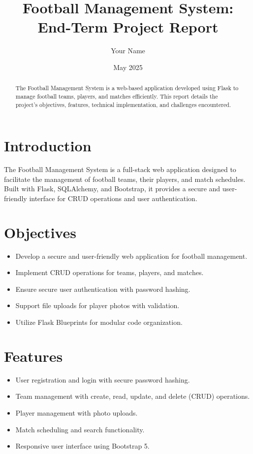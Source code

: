 \documentclass[a4paper,12pt]{article}
\begin{document}
\title{Football Management System: End-Term Project Report}
\author{Your Name}
\date{May 2025}
\maketitle

\begin{abstract}
The Football Management System is a web-based application developed using Flask to manage football teams, players, and matches efficiently. This report details the project's objectives, features, technical implementation, and challenges encountered.
\end{abstract}

\section{Introduction}
The Football Management System is a full-stack web application designed to facilitate the management of football teams, their players, and match schedules. Built with Flask, SQLAlchemy, and Bootstrap, it provides a secure and user-friendly interface for CRUD operations and user authentication.

\section{Objectives}
\begin{itemize}
    \item Develop a secure and user-friendly web application for football management.
    \item Implement CRUD operations for teams, players, and matches.
    \item Ensure secure user authentication with password hashing.
    \item Support file uploads for player photos with validation.
    \item Utilize Flask Blueprints for modular code organization.
\end{itemize}

\section{Features}
\begin{itemize}
    \item User registration and login with secure password hashing.
    \item Team management with create, read, update, and delete (CRUD) operations.
    \item Player management with photo uploads.
    \item Match scheduling and search functionality.
    \item Responsive user interface using Bootstrap 5.
\end{itemize}
\end{document}
